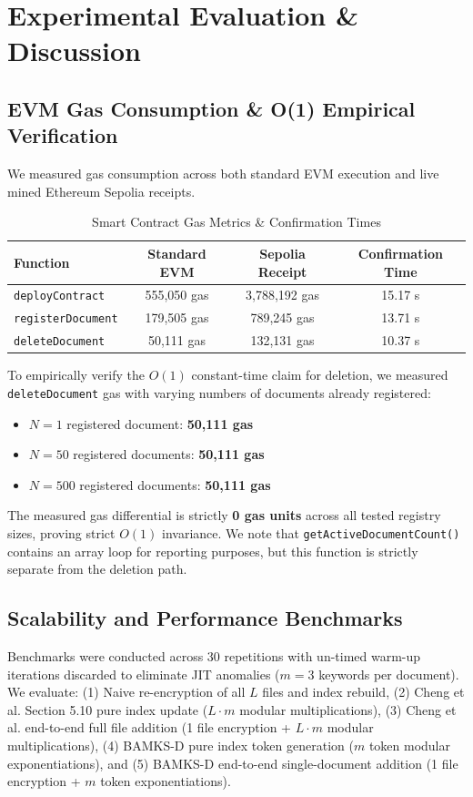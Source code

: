 \documentclass[conference]{IEEEtran}
\begin{document}
\section{Experimental Evaluation \& Discussion}

\subsection{EVM Gas Consumption & O(1) Empirical Verification}
We measured gas consumption across both standard EVM execution and live mined Ethereum Sepolia receipts.

\begin{table}[htbp]
\caption{Smart Contract Gas Metrics & Confirmation Times}
\label{tab:gas}
\centering
\begin{tabular}{lccc}
\toprule
\textbf{Function} & \textbf{Standard EVM} & \textbf{Sepolia Receipt} & \textbf{Confirmation Time} \\
\midrule
\texttt{deployContract} & 555,050 gas & 3,788,192 gas & 15.17 s \\
\texttt{registerDocument} & 179,505 gas & 789,245 gas & 13.71 s \\
\texttt{deleteDocument} & 50,111 gas & 132,131 gas & 10.37 s \\
\bottomrule
\end{tabular}
\end{table}

To empirically verify the $O(1)$ constant-time claim for deletion, we measured \texttt{deleteDocument} gas with varying numbers of documents already registered:
\begin{itemize}
    \item $N = 1$ registered document: \textbf{50,111 gas}
    \item $N = 50$ registered documents: \textbf{50,111 gas}
    \item $N = 500$ registered documents: \textbf{50,111 gas}
\end{itemize}
The measured gas differential is strictly \textbf{0 gas units} across all tested registry sizes, proving strict $O(1)$ invariance. We note that \texttt{getActiveDocumentCount()} contains an array loop for reporting purposes, but this function is strictly separate from the deletion path.

\subsection{Scalability and Performance Benchmarks}
Benchmarks were conducted across 30 repetitions with un-timed warm-up iterations discarded to eliminate JIT anomalies ($m=3$ keywords per document). We evaluate: (1) Naive re-encryption of all $L$ files and index rebuild, (2) Cheng et al. Section 5.10 pure index update ($L \cdot m$ modular multiplications), (3) Cheng et al. end-to-end full file addition (1 file encryption + $L \cdot m$ modular multiplications), (4) BAMKS-D pure index token generation ($m$ token modular exponentiations), and (5) BAMKS-D end-to-end single-document addition (1 file encryption + $m$ token exponentiations).
\end{document}
